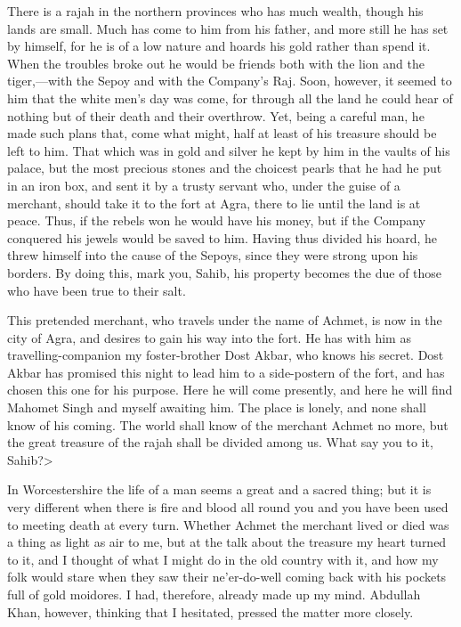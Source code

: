 There is a rajah in the northern provinces who has much wealth, though his lands are small. Much has come to him from his father, and more still he has set by himself, for he is of a low nature and hoards his gold rather than spend it. When the troubles broke out he would be friends both with the lion and the tiger,—with the Sepoy and with the Company's Raj. Soon, however, it seemed to him that the white men's day was come, for through all the land he could hear of nothing but of their death and their overthrow. Yet, being a careful man, he made such plans that, come what might, half at least of his treasure should be left to him. That which was in gold and silver he kept by him in the vaults of his palace, but the most precious stones and the choicest pearls that he had he put in an iron box, and sent it by a trusty servant who, under the guise of a merchant, should take it to the fort at Agra, there to lie until the land is at peace. Thus, if the rebels won he would have his money, but if the Company conquered his jewels would be saved to him. Having thus divided his hoard, he threw himself into the cause of the Sepoys, since they were strong upon his borders. By doing this, mark you, Sahib, his property becomes the due of those who have been true to their salt.

This pretended merchant, who travels under the name of Achmet, is now in the city of Agra, and desires to gain his way into the fort. He has with him as travelling-companion my foster-brother Dost Akbar, who knows his secret. Dost Akbar has promised this night to lead him to a side-postern of the fort, and has chosen this one for his purpose. Here he will come presently, and here he will find Mahomet Singh and myself awaiting him. The place is lonely, and none shall know of his coming. The world shall know of the merchant Achmet no more, but the great treasure of the rajah shall be divided among us. What say you to it, Sahib?>

In Worcestershire the life of a man seems a great and a sacred thing; but it is very different when there is fire and blood all round you and you have been used to meeting death at every turn. Whether Achmet the merchant lived or died was a thing as light as air to me, but at the talk about the treasure my heart turned to it, and I thought of what I might do in the old country with it, and how my folk would stare when they saw their ne'er-do-well coming back with his pockets full of gold moidores. I had, therefore, already made up my mind. Abdullah Khan, however, thinking that I hesitated, pressed the matter more closely.


